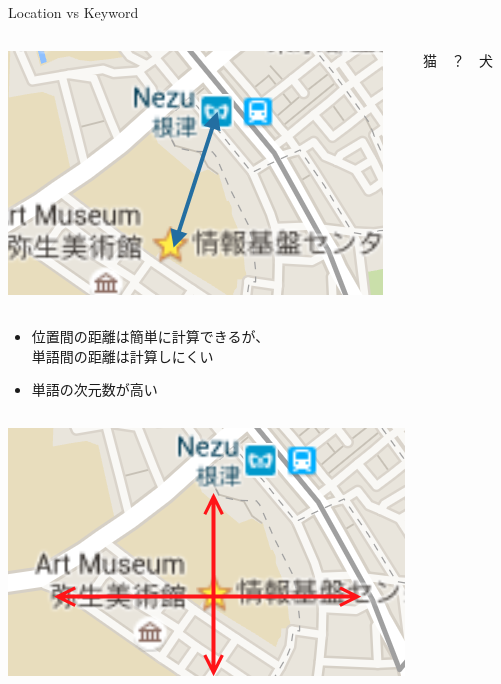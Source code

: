 \documentclass[14pt,xcolor=dvipsnames,table,dvipdfmx]{beamer}
\begin{document}
\begin{frame}{Location vs Keyword}
	\begin{columns}[c]
		\begin{column}{0.3\textwidth} %
			\includegraphics[width=\columnwidth]{photo8.png}
		\end{column}
		\begin{column}{0.3\textwidth} %
		\begin{center}
			猫　？　犬
		\end{center}
		\end{column}
	\end{columns}
    \begin{block}{}
    \begin{itemize}
		\item 位置間の距離は簡単に計算できるが、\\ 単語間の距離は計算しにくい
		\item 単語の次元数が高い
   \end{itemize}
    \end{block}
	\begin{columns}[c]
		\begin{column}{0.3\textwidth} %
			\includegraphics[width=\columnwidth]{photo8-1.png}

\end{column}
\end{columns}
\end{frame}
\end{document}
